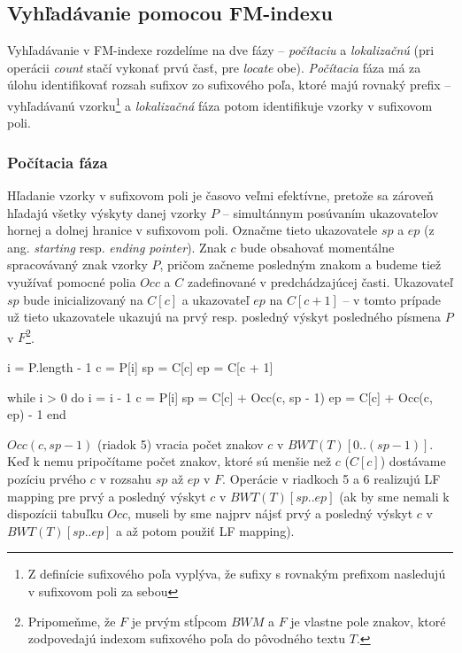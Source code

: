     \subsection{Vyhľadávanie pomocou FM-indexu}
    Vyhľadávanie v FM-indexe rozdelíme na dve fázy -- \emph{počítaciu} a \emph{lokalizačnú} (pri operácii \emph{count} stačí vykonať prvú časť, pre \emph{locate} obe). \emph{Počítacia} fáza má za úlohu identifikovať rozsah sufixov zo sufixového poľa, ktoré majú rovnaký prefix -- vyhľadávanú vzorku\footnote{Z definície sufixového poľa vyplýva, že sufixy s rovnakým prefixom nasledujú v sufixovom poli za sebou} a \emph{lokalizačná} fáza potom identifikuje vzorky v sufixovom poli.
    
    \subsubsection{Počítacia fáza}
    Hľadanie vzorky v sufixovom poli je časovo veľmi efektívne, pretože sa zároveň hľadajú všetky výskyty danej vzorky $P$ -- simultánnym posúvaním ukazovateľov hornej a dolnej hranice v sufixovom poli. Označme tieto ukazovatele $sp$ a $ep$ (z ang. \emph{starting} resp. \emph{ending pointer}). Znak $c$ bude obsahovať momentálne spracovávaný znak vzorky $P$, pričom začneme posledným znakom a budeme tiež využívať pomocné polia $Occ$ a $C$ zadefinované v predchádzajúcej časti. Ukazovateľ $sp$ bude inicializovaný na $C[c]$ a ukazovateľ $ep$ na $C[c + 1]$ -- v tomto prípade už tieto ukazovatele ukazujú na prvý resp. posledný výskyt posledného písmena $P$ v $F$\footnote{Pripomeňme, že $F$ je prvým stĺpcom $BWM$ a $F$ je vlastne pole znakov, ktoré zodpovedajú indexom sufixového poľa do pôvodného textu $T$.}.
    
    \bigskip
    
    \begin{pseudocode}[label=lst:fm_search_algorithm,caption={Algoritmus na hľadanie vzorky pomocou FM-indexu}]
i = P.length - 1
c = P[i]
sp = C[c]
ep = C[c + 1]

while i > 0 do
  i = i - 1
  c = P[i]
  sp = C[c] + Occ(c, sp - 1)
  ep = C[c] + Occ(c, ep) - 1
end
    \end{pseudocode}
    
    $Occ(c, sp - 1)$ (riadok 5) vracia počet znakov $c$ v $BWT(T)[0..(sp - 1)]$. Keď k nemu pripočítame počet znakov, ktoré sú menšie než $c$ ($C[c]$) dostávame pozíciu prvého $c$ v rozsahu $sp$ až $ep$ v $F$. Operácie v riadkoch 5 a 6 realizujú LF mapping pre prvý a posledný výskyt $c$ v $BWT(T)[sp..ep]$ (ak by sme nemali k dispozícii tabuľku $Occ$, museli by sme najprv nájsť prvý a posledný výskyt $c$ v $BWT(T)[sp..ep]$ a až potom použiť LF mapping).
    
